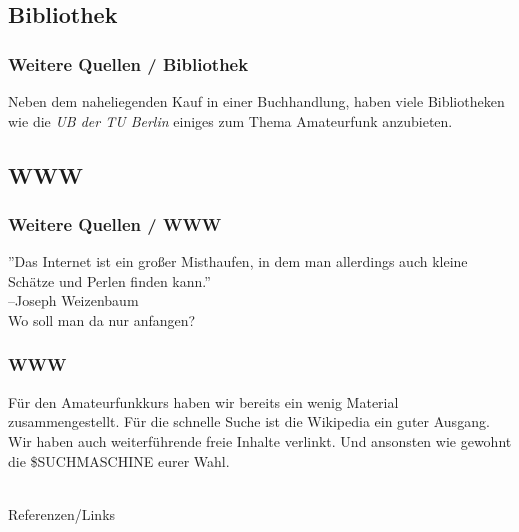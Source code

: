 \subsection{Bibliothek}
\begin{frame}
    \frametitle{Weitere Quellen / Bibliothek}

    Neben dem naheliegenden Kauf in einer Buchhandlung, haben viele Bibliotheken
    wie die \emph{UB der TU Berlin}\hyperlink{refs}{\cite{ub}} einiges zum Thema
    Amateurfunk anzubieten.

\end{frame}

\subsection{WWW}

\begin{frame}
    \frametitle{Weitere Quellen / WWW}

    ''Das Internet ist ein großer Misthaufen, in dem man allerdings auch kleine
    Schätze und Perlen finden kann.''\hyperlink{refs}{\cite{quote}} \\[1em]
    \flushright --Joseph Weizenbaum \\[4em]

    \center Wo soll man da nur anfangen?

\end{frame}

\begin{frame}
    \frametitle{WWW}

    Für den Amateurfunkkurs haben wir bereits ein wenig
    Material\hyperlink{refs}{\cite{mat}} zusammengestellt. Für die schnelle
    Suche ist die Wikipedia\hyperlink{refs}{\cite{wp}} ein guter Ausgang. \\[2em]

    Wir haben auch weiterführende freie Inhalte\hyperlink{refs}{\cite{fi}}
    verlinkt. Und ansonsten wie gewohnt die \$SUCHMASCHINE eurer Wahl.

\end{frame}

\renewcommand{\refname}{Referenzen}

\hypertarget{refs}{}
\textcolor{white}{} \\ %
\Large Referenzen/Links
\footnotesize

